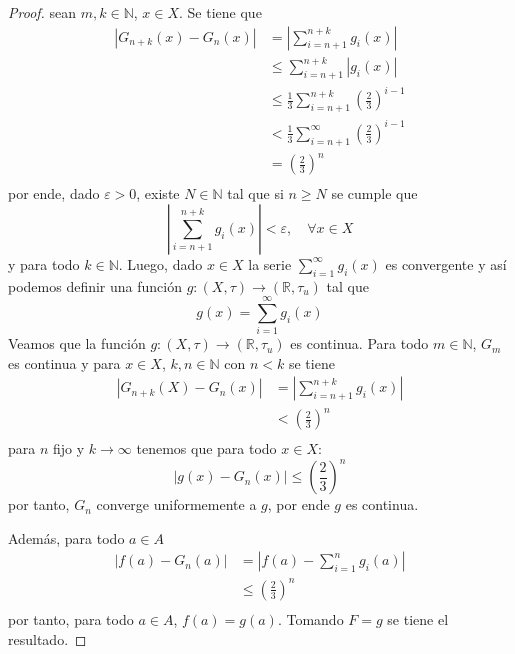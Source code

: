 \documentclass[12pt]{report}
\newcounter{it}
\theoremstyle{largebreak}
\newcommand\abs[1]{\ensuremath{\left|#1\right|}}
\newcommand\cf[3]{\ensuremath{#1:#2\rightarrow#3}}
\begin{document}
\begin{proof}
        sean $m,k\in\mathbb{N}$, $x\in X$. Se tiene que
        \begin{equation*}
            \begin{split}
                \abs{G_{ n+k}(x)-G_n(x)}&=\abs{\sum_{ i=n+1}^{ n+k}g_i(x)}\\
                &\leq\sum_{ i=n+1}^{ n+k}\abs{g_i(x)}\\
                &\leq\frac{1}{3}\sum_{ i=n+1}^{ n+k}\left(\frac{2}{3}\right)^{ i-1}\\
                &<\frac{1}{3}\sum_{ i=n+1}^{\infty}\left(\frac{2}{3}\right)^{ i-1}\\
                &=\left(\frac{2}{3}\right)^n\\
            \end{split}
        \end{equation*}
        por ende, dado $\varepsilon>0$, existe $N\in\mathbb{N}$ tal que si $n\geq N$ se cumple que
        \begin{equation*}
            \abs{\sum_{ i=n+1}^{ n+k}g_i(x)}<\varepsilon,\quad\forall x\in X
        \end{equation*}
        y para todo $k\in\mathbb{N}$. Luego, dado $x\in X$ la serie $\sum_{ i=1}^\infty g_i(x)$ es convergente y así podemos definir una función $\cf{g}{(X,\tau)}{(\mathbb{R},\tau_u)}$ tal que
        \begin{equation*}
            g(x)=\sum_{ i=1}^\infty g_i(x)
        \end{equation*}
        Veamos que la función $\cf{g}{(X,\tau)}{(\mathbb{R},\tau_u)}$ es continua. Para todo $m\in\mathbb{N}$, $G_m$ es continua y para $x\in X$, $k,n\in\mathbb{N}$ con $n<k$ se tiene
        \begin{equation*}
            \begin{split}
                \abs{G_{n+k}(X)-G_n(x)}&=\abs{\sum_{ i=n+1}^{ n+k} g_i(x)}\\
                &<\left(\frac{2}{3}\right)^n\\
            \end{split}
        \end{equation*}
        para $n$ fijo y $k\rightarrow\infty$ tenemos que para todo $x\in X$:
        \begin{equation*}
            \abs{g(x)-G_n(x)}\leq\left(\frac{2}{3}\right)^n
        \end{equation*}
        por tanto, $G_n$ converge uniformemente a $g$, por ende $g$ es continua.

        Además, para todo $a\in A$
        \begin{equation*}
            \begin{split}
                \abs{f(a)-G_n(a)}&=\abs{f(a)-\sum_{ i=1}^n g_i(a)}\\
                &\leq\left(\frac{2}{3}\right)^n\\
            \end{split}
        \end{equation*}
        por tanto, para todo $a\in A$, $f(a)=g(a)$. Tomando $F=g$ se tiene el resultado.
    \end{proof}
\end{document}
